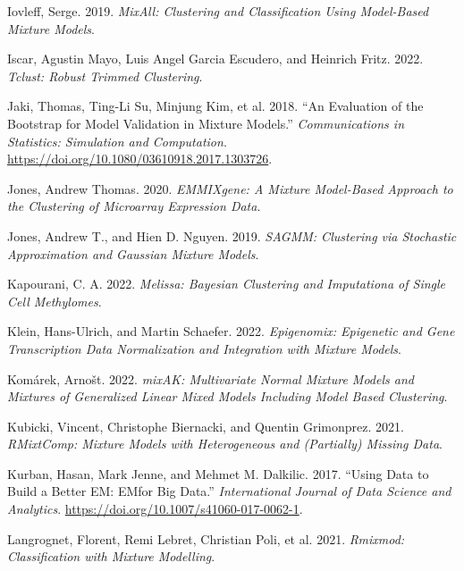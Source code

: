\begin{CSLReferences}{1}{0}
\leavevmode{}%
Iovleff, Serge. 2019. \emph{MixAll: Clustering and Classification Using Model-Based Mixture Models}.

\leavevmode{}%
Iscar, Agustin Mayo, Luis Angel Garcia Escudero, and Heinrich Fritz. 2022. \emph{Tclust: Robust Trimmed Clustering}.

\leavevmode{}%
Jaki, Thomas, Ting-Li Su, Minjung Kim, et al. 2018. {``An Evaluation of the Bootstrap for Model Validation in Mixture Models.''} \emph{Communications in Statistics: Simulation and Computation}. \url{https://doi.org/10.1080/03610918.2017.1303726}.

\leavevmode{}%
Jones, Andrew Thomas. 2020. \emph{EMMIXgene: A Mixture Model-Based Approach to the Clustering of Microarray Expression Data}.

\leavevmode{}%
Jones, Andrew T., and Hien D. Nguyen. 2019. \emph{SAGMM: Clustering via Stochastic Approximation and Gaussian Mixture Models}.

\leavevmode{}%
Kapourani, C. A. 2022. \emph{Melissa: Bayesian Clustering and Imputationa of Single Cell Methylomes}.

\leavevmode{}%
Klein, Hans-Ulrich, and Martin Schaefer. 2022. \emph{Epigenomix: Epigenetic and Gene Transcription Data Normalization and Integration with Mixture Models}.

\leavevmode{}%
Komárek, Arnošt. 2022. \emph{mixAK: Multivariate Normal Mixture Models and Mixtures of Generalized Linear Mixed Models Including Model Based Clustering}.

\leavevmode{}%
Kubicki, Vincent, Christophe Biernacki, and Quentin Grimonprez. 2021. \emph{RMixtComp: Mixture Models with Heterogeneous and (Partially) Missing Data}.

\leavevmode{}%
Kurban, Hasan, Mark Jenne, and Mehmet M. Dalkilic. 2017. {``Using Data to Build a Better {EM}: {EM}\textasteriskcentered for Big Data.''} \emph{International Journal of Data Science and Analytics}. \url{https://doi.org/10.1007/s41060-017-0062-1}.

\leavevmode{}%
Langrognet, Florent, Remi Lebret, Christian Poli, et al. 2021. \emph{Rmixmod: Classification with Mixture Modelling}.


\end{CSLReferences}
